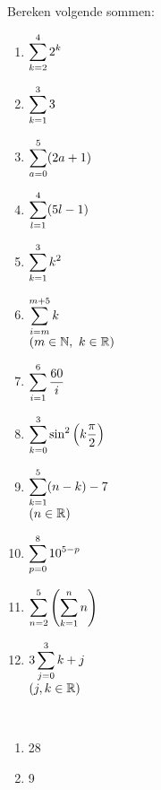 \documentclass{ximera}
\begin{document}
\begin{oefening2}
Bereken volgende sommen:

\noindent
\begin{minipage}[t]{.24\textwidth}
\begin{enumerate}
\item $\displaystyle{\sum^4_{k=2}2^k}$
\item $\displaystyle{\sum^3_{k=1}3}$
\item $\displaystyle{\sum^5_{a=0}(2a+1)}$
\end{enumerate}
\end{minipage}
\begin{minipage}[t]{.24\textwidth}
\begin{enumerate}\setcounter{enumi}{3}
\item $\displaystyle{\sum^4_{l=1}(5l-1)}$
\item $\displaystyle{\sum^3_{k=1}k^2}$
\item $\displaystyle{\sum^{m+5}_{i=m}k}$\\$(m\in\mathbb{N},\ k\in\mathbb{R})$
\end{enumerate}
\end{minipage}
\begin{minipage}[t]{.27\textwidth}
\begin{enumerate}\setcounter{enumi}{6}
\item $\displaystyle{\sum^6_{i=1}\frac{60}{i}}$
\item $\displaystyle{\sum^3_{k=0}\sin^2\left(k\frac{\pi}{2}\right)}$
\item $\displaystyle{\sum^5_{k=1}(n-k)-7}$\\$(n\in\mathbb{R})$
\end{enumerate}
\end{minipage}
\begin{minipage}[t]{.25\textwidth}
\begin{enumerate}\setcounter{enumi}{9}
\item $\displaystyle{\sum^8_{p=0}10^{5-p}}$
\item $\displaystyle{\sum^5_{n=2}\left(\sum^n_{k=1}n\right)}$
\item $\displaystyle{3\sum^3_{j=0}k+j}$\\$(j,k\in\mathbb{R})$
\end{enumerate}
\end{minipage}
\begin{opl}%
\mbox{ }\newline
\begin{minipage}[t]{.24\textwidth}
\begin{enumerate}
\item 28
\item 9

\end{enumerate}
\end{minipage}
\end{opl}
\end{oefening2}
\end{document}
